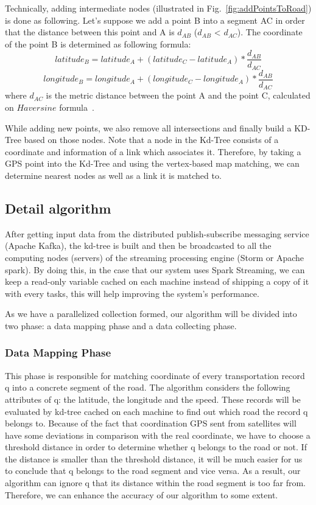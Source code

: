 \documentclass{acm_proc_article-sp}
\begin{document}
Technically, adding intermediate nodes (illustrated in Fig.~\ref{fig:addPointsToRoad}) is done as following. Let's suppose we add a point B into a segment AC in order that the distance between this point and A is $d_{AB}$ ($d_{AB}$ < $d_{AC}$). The coordinate of the point B is determined as following formula:
\[ latitude_{B} = latitude_{A} + (latitude_{C} - latitude_{A}) \ast \frac{d_{AB}}{d_{AC}}\]
\[ longitude_{B} = longitude_{A} + (longitude_{C} - longitude_{A}) \ast \frac{d_{AB}}{d_{AC}}\]
where $d_{AC}$ is the metric distance between the point A and the point C, calculated on $Haversine$ formula~\cite{haversineweb}.

While adding new points, we also remove all intersections and finally build a KD-Tree based on those nodes. Note that a node in the Kd-Tree consists of a coordinate and information of a link which associates it. Therefore, by taking a GPS point into the Kd-Tree and using the vertex-based map matching, we can determine nearest nodes as well as a link it is matched to.
	
\subsection{Detail algorithm}
		
After getting input data from the distributed publish-subscribe messaging service (Apache Kafka), the kd-tree is built and then be broadcasted to all the computing nodes (servers) of the streaming processing engine (Storm or Apache spark). By doing this, in the case that our system uses Spark Streaming, we can keep a read-only variable cached on each machine instead of shipping a copy of it with every tasks, this will help improving the system's performance.
	
As we have a parallelized collection formed, our algorithm will be divided into two phase: a data mapping phase and a data collecting phase. 

\subsubsection{Data Mapping Phase} 

This phase is responsible for matching coordinate of every transportation record q into a concrete segment of the road. The algorithm considers the following attributes of q: the latitude, the longitude and the speed. These records will be evaluated by kd-tree cached on each machine to find out which road the record q belongs to. Because of the fact that coordination GPS sent from satellites will have some deviations in comparison with the real coordinate, we have to choose a threshold distance in order to determine whether q belongs to the road or not. If the distance is smaller than the threshold distance, it will be much easier for us to conclude that q belongs to the road segment and vice versa. As a result, our algorithm can ignore q that its distance within the road segment is too far from. Therefore, we can enhance the accuracy of our algorithm to some extent.
\end{document}
